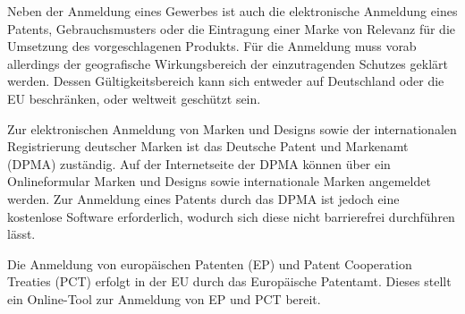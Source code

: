 
Neben der Anmeldung eines Gewerbes ist auch die elektronische Anmeldung eines Patents, Gebrauchsmusters oder die Eintragung einer 
Marke von Relevanz für die Umsetzung des vorgeschlagenen Produkts. Für die Anmeldung muss vorab allerdings der geografische Wirkungsbereich
der einzutragenden Schutzes geklärt werden. Dessen Gültigkeitsbereich kann sich entweder auf Deutschland oder die EU beschränken, oder 
weltweit geschützt sein.

Zur elektronischen Anmeldung von Marken und Designs sowie der internationalen Registrierung deutscher Marken ist das Deutsche Patent und Markenamt
(DPMA) zuständig. Auf der Internetseite der DPMA können über ein Onlineformular Marken und Designs sowie internationale Marken angemeldet werden.
Zur Anmeldung eines Patents durch das DPMA ist jedoch eine kostenlose Software erforderlich, wodurch sich diese nicht barrierefrei durchführen lässt.

Die Anmeldung von europäischen Patenten (EP) und Patent Cooperation Treaties (PCT) erfolgt in der EU durch das Europäische Patentamt.
Dieses stellt ein Online-Tool zur Anmeldung von EP und PCT bereit.
